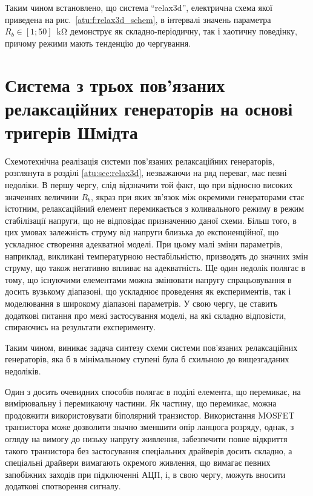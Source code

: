 Таким чином встановлено, що система ``relax3d'', електрична схема
якої приведена на рис.~\ref{atu:f:relax3d_schem}, в інтервалі значень
параметра
$ R_b \in [1; 50] \; \SI{}{ \kilo \ohm} $ демонструє як складно-періодичну,
так і хаотичну поведінку, причому режими мають тенденцію до
чергування.

\section{Система з трьох пов'язаних релаксаційних генераторів на основі тригерів Шмідта}
\label{atu:sec:relax3ds}

Схемотехнічна реалізація системи пов'язаних релаксаційних
генераторів, розглянута в розділі \ref{atu:sec:relax3d}, незважаючи на
ряд переваг, має певні недоліки. В першу чергу, слід відзначити
той факт, що при відносно високих значеннях величини
$ R_b $, якраз при яких зв'язок між окремими генераторами стає
істотним, релаксаційний елемент перемикається з коливального
режиму в режим стабілізації напруги, що не відповідає
призначенню даної схеми. Більш того, в цих умовах залежність
струму від напруги близька до експоненційної, що ускладнює
створення адекватної моделі. При цьому малі зміни параметрів,
наприклад, викликані температурною нестабільністю, призводять
до значних змін струму, що також негативно впливає
на адекватність. Ще один недолік полягає в тому, що існуючими
елементами можна змінювати напругу спрацьовування в досить
вузькому діапазоні, що ускладнює проведення як експериментів,
так і моделювання в широкому діапазоні параметрів. У свою чергу,
це ставить додаткові питання про межі застосування моделі, на
які складно відповісти, спираючись на результати експерименту.

Таким чином, виникає задача синтезу схеми системи пов'язаних
релаксаційних генераторів, яка б в мінімальному ступені була
б схильною до вищезгаданих недоліків.

Один з досить очевидних способів полягає в поділі
елемента, що перемикає, на вимірювальну і перемикаючу частини. Як
частину, що перемикає, можна продовжити використовувати біполярний
транзистор. Використання MOSFET транзистора може дозволити значно
зменшити опір ланцюга розряду, однак, з огляду на вимогу до
низьку напругу живлення, забезпечити повне відкриття такого
транзистора без застосування спеціальних драйверів досить
складно, а спеціальні драйвери вимагають окремого живлення,
що вимагає певних запобіжних заходів при підключенні АЦП, і,
в свою чергу, можуть вносити додаткові спотворення сигналу.

